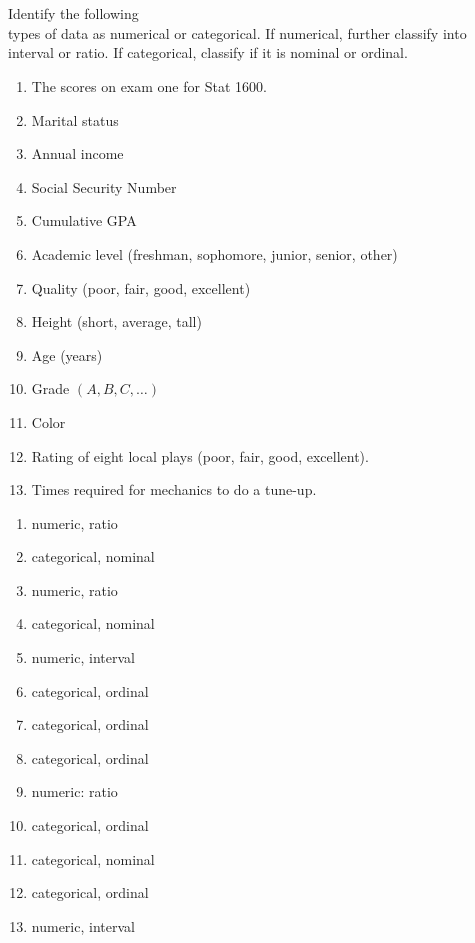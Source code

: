\documentclass[11pt, chapterprefix=true]{scrbook}\usepackage[]{graphicx}\usepackage[]{color}
\begin{document}
\newpage

\twocolumn

\section{}

 \begin{exercises}    %
  \begin{exercise}  %

Identify the following \\ types of  data as numerical or categorical.  If numerical, further classify into interval or ratio. If categorical, classify if it is nominal or ordinal.

	  \begin{enumerate}
	  \item The scores on exam one for Stat 1600.
    \item Marital status
    \item Annual income
    \item Social Security Number
    \item Cumulative GPA
    \item Academic level (freshman, sophomore, junior, senior, other)
    \item Quality (poor, fair, good, excellent)
    \item Height (short, average, tall)
    \item Age (years)
    \item Grade $(A, B, C, \dots)$
    \item Color
    \item Rating of eight local plays (poor, fair, good, excellent).
    \item Times required for mechanics to do a tune-up.
  	\end{enumerate}


  \end{exercise}
  \begin{solution}  %

    \begin{enumerate}
	  \item   numeric, ratio
    \item  categorical, nominal
    \item  numeric, ratio
    \item  categorical, nominal
    \item  numeric, interval
    \item  categorical, ordinal
    \item  categorical, ordinal
    \item  categorical, ordinal
    \item  numeric: ratio
    \item  categorical, ordinal
    \item  categorical, nominal
    \item  categorical, ordinal
    \item  numeric, interval
  	\end{enumerate}
  \end{solution}


\end{exercises}
\end{document}
